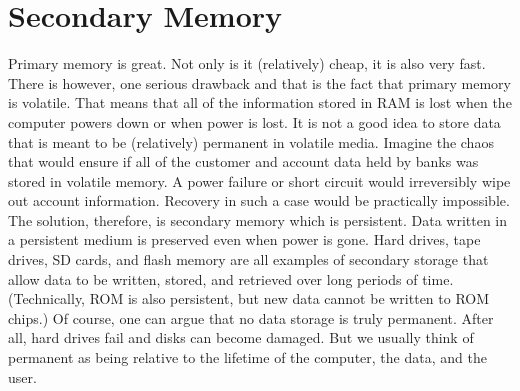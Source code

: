 \section{Secondary Memory}
Primary memory is great. Not only is it (relatively) cheap, it is also very fast. There is however, one serious drawback and that is the fact that primary memory is volatile. That means that all of the information stored in RAM is lost when the computer powers down or when power is lost.
It is not a good idea to store data that is meant to be (relatively) permanent in volatile media. Imagine the chaos that would ensure if all of the customer and account data held by banks was stored in volatile memory. A power failure or short circuit would irreversibly wipe out account information. Recovery in such a case would be practically impossible.
The solution, therefore, is secondary memory which is persistent. Data written in a persistent medium is preserved even when power is gone. Hard drives, tape drives, SD cards, and flash memory are all examples of secondary storage that allow data to be written, stored, and retrieved over long periods of time. (Technically, ROM is also persistent, but new data cannot be written to ROM chips.) Of course, one can argue that no data storage is truly permanent. After all, hard drives fail and disks can become damaged. But we usually think of permanent as being relative to the lifetime of the computer, the data, and the user.